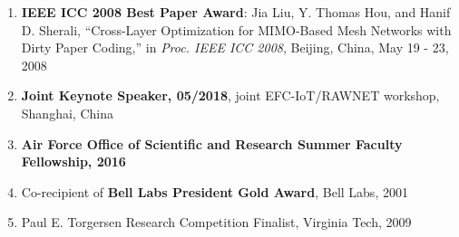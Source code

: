 \documentclass[overlapped,line,letterpaper]{res1}
\begin{document}
\begin{resume}
\begin{enumerate}
\vspace{.05in}
\item {\bf IEEE ICC 2008 Best Paper Award}: Jia Liu, Y. Thomas Hou, and Hanif D. Sherali, ``Cross-Layer Optimization for MIMO-Based Mesh Networks with Dirty Paper Coding,'' in {\em Proc. IEEE ICC 2008}, Beijing, China, May 19 - 23, 2008

\vspace{.05in}
\item {\bf Joint Keynote Speaker, 05/2018}, joint EFC-IoT/RAWNET workshop, Shanghai, China


\vspace{.05in}
\item {\bf Air Force Office of Scientific and Research Summer Faculty Fellowship, 2016}

\vspace{.05in}
\item Co-recipient of {\bf Bell Labs President Gold Award}, Bell Labs, 2001

\vspace{.05in}
\item Paul E. Torgersen Research Competition Finalist, Virginia Tech, 2009
\end{enumerate}





\end{resume}
\end{document}
